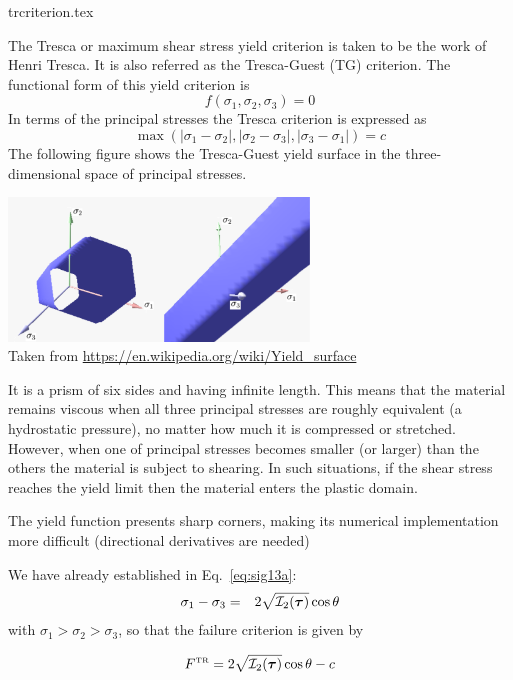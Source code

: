 \begin{flushright} {\tiny {\color{gray} trcriterion.tex}} \end{flushright}

The Tresca or maximum shear stress yield criterion is taken to be the work of Henri Tresca. It is also referred as the Tresca-Guest (TG) criterion. The functional form of this yield criterion is
\[
f(\sigma_1,\sigma_2,\sigma_3) = 0
\]
In terms of the principal stresses the Tresca criterion is expressed as
\[
{\max(|\sigma_1 - \sigma_2| , |\sigma_2 - \sigma_3| , |\sigma_3 - \sigma_1| ) = c }
\]
The following figure shows the Tresca-Guest yield surface in the three-dimensional space of principal stresses. 
\begin{center}
\includegraphics[width=0.6\textwidth]{images/rheology/tresca/Tresca.pdf}\\
{\captionfont Taken from \url{https://en.wikipedia.org/wiki/Yield_surface}}
\end{center}
It is a prism of six sides and having infinite length. This means that the 
material remains viscous when all three principal stresses are roughly equivalent 
(a hydrostatic pressure), no matter how much it is compressed or stretched. 
However, when one of principal stresses becomes smaller (or larger) than the others 
the material is subject to shearing. In such situations, if the shear 
stress reaches the yield limit then the material enters the plastic domain. 

\begin{remark}
The yield function presents sharp corners, making its numerical implementation 
more difficult (directional derivatives are needed)
\end{remark}

We have already established in Eq.~\eqref{eq:sig13a}:
\begin{eqnarray}
\sigma_1 - \sigma_3  &=& 2 \sqrt{{\cal I}_2({\bm \tau})} \cos \theta \nonumber
\end{eqnarray}
with $\sigma_1>\sigma_2>\sigma_3$,
so that the failure criterion is given by
\begin{mdframed}[backgroundcolor=blue!5]
\[
F^{\text{\tiny TR}}=2\sqrt{ {\cal I}_2({\bm \tau})  } \cos \theta - c 
\]
\end{mdframed}

